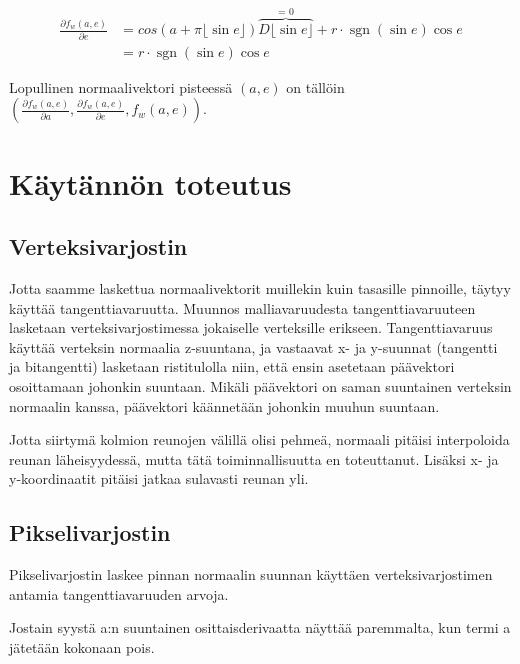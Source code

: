 \documentclass[utf8,bachelor]{gradu3}
\DeclareMathOperator{\sgn}{sgn}
\begin{document}
\begin{equation}
\label{eq:partialE}
\begin{aligned}
\frac{\partial f_w(a,e)}{\partial e} & = cos(a + \pi\lfloor \sin{e} \rfloor )  \overbrace{ D \lfloor \sin{e} \rfloor }^\text{= 0} + r \cdot \sgn ( \sin e )\cos e \\
& = r \cdot \sgn ( \sin e )\cos e
\end{aligned}
\end{equation}

Lopullinen normaalivektori pisteessä $(a,e)$ on tällöin $(\frac{\partial f_w(a,e)}{\partial a}, \frac{\partial f_w(a,e)}{\partial e}, f_w(a,e))$.

\chapter{Käytännön toteutus}

\section{Verteksivarjostin}

Jotta saamme laskettua normaalivektorit muillekin kuin tasasille pinnoille, täytyy käyttää tangenttiavaruutta. Muunnos malliavaruudesta tangenttiavaruuteen lasketaan verteksivarjostimessa jokaiselle verteksille erikseen. Tangenttiavaruus käyttää verteksin normaalia z-suuntana, ja vastaavat x- ja y-suunnat (tangentti ja bitangentti) lasketaan ristitulolla niin, että ensin asetetaan päävektori osoittamaan johonkin suuntaan. Mikäli päävektori on saman suuntainen verteksin normaalin kanssa, päävektori käännetään johonkin muuhun suuntaan.


Jotta siirtymä kolmion reunojen välillä olisi pehmeä, normaali pitäisi interpoloida reunan läheisyydessä, mutta tätä toiminnallisuutta en toteuttanut. Lisäksi x- ja y-koordinaatit pitäisi jatkaa sulavasti reunan yli.

\section{Pikselivarjostin}

Pikselivarjostin laskee pinnan normaalin suunnan käyttäen verteksivarjostimen antamia tangenttiavaruuden arvoja.

Jostain syystä a:n suuntainen osittaisderivaatta näyttää paremmalta, kun termi a jätetään kokonaan pois.
\end{document}
